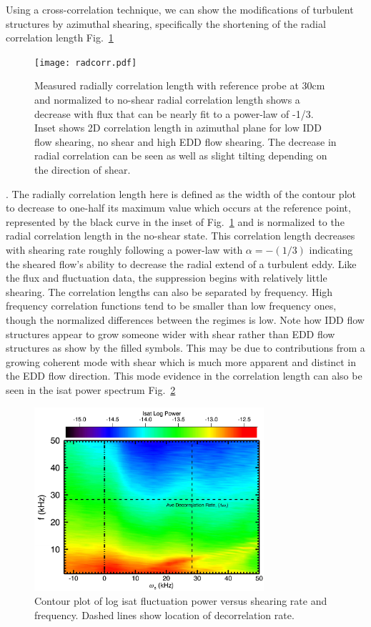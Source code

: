 \documentclass[%
 aps,
 prl,
 amsmath,amssymb,
 reprint,%
]{revtex4-1}
\begin{document}
Using a cross-correlation technique, we can show the modifications of turbulent structures by azimuthal shearing, specifically the shortening of the radial correlation length
Fig.~\ref{fig:radcorr}
\begin{figure}
\begin{center}
\texttt{[image: radcorr.pdf]}%
\end{center}
\caption{\label{fig:radcorr} Measured radially correlation length with reference probe at 30cm and normalized to no-shear radial correlation length shows a decrease with flux that can be nearly fit to a power-law of -1/3. Inset shows 2D correlation length in azimuthal plane for low IDD flow shearing, no shear and high EDD flow shearing. The decrease in radial correlation can be seen as well as slight tilting depending on the direction of shear.}
\end{figure}
. The radially correlation length here is defined as the width of the contour plot to decrease to one-half its maximum value which occurs at the reference point, represented by the black curve in the inset of Fig.~\ref{fig:radcorr} and is normalized to the radial correlation length in the no-shear state. This correlation length decreases with shearing rate roughly following a power-law with $\alpha = -(1/3)$ indicating the sheared flow's ability to decrease the radial extend of a turbulent eddy. Like the flux and fluctuation data, the suppression begins with relatively little shearing. The correlation lengths can also be separated by frequency. High frequency correlation functions tend to be smaller than low frequency ones, though the normalized differences between the regimes is low. Note how IDD flow structures appear to grow someone wider with shear rather than EDD flow structures as show by the filled symbols. This may be due to contributions from a growing coherent mode with shear which is much more apparent and distinct in the EDD flow direction. This mode evidence in the correlation length can also be seen in the isat power spectrum
Fig.~\ref{fig:powercontour}
\begin{figure}
\begin{center}
\includegraphics[width=8.5cm]{powercontour.pdf}%
\end{center}
\caption{\label{fig:powercontour} Contour plot of log isat fluctuation power versus shearing rate and frequency. Dashed lines show location of decorrelation rate.}
\end{figure}
\end{document}
